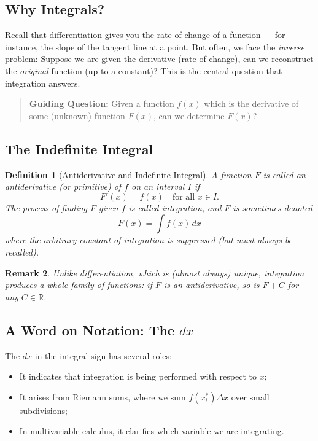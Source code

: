 \documentclass[11pt]{article}
\newtheorem{definition}{Definition}[section]
\newtheorem{remark}[definition]{Remark}
\theoremstyle{definition}
\begin{document}
\subsection*{Why Integrals?}

Recall that differentiation gives you the rate of change of a function — for instance, the slope of the tangent line at a point. But often, we face the \emph{inverse} problem: Suppose we are given the derivative (rate of change), can we reconstruct the \emph{original} function (up to a constant)? This is the central question that integration answers.

\bigskip

\begin{quote}
\textbf{Guiding Question:} Given a function $f(x)$ which is the derivative of some (unknown) function $F(x)$, can we determine $F(x)$?
\end{quote}

\subsection*{The Indefinite Integral}

\begin{definition}[Antiderivative and Indefinite Integral]
A function $F$ is called an \emph{antiderivative} (or \emph{primitive}) of $f$ on an interval $I$ if
\[
    F'(x) = f(x) \quad \text{for all } x \in I.
\]
The process of finding $F$ given $f$ is called \emph{integration}, and $F$ is sometimes denoted
\[
    F(x) = \int f(x)\, dx
\]
where the arbitrary constant of integration is suppressed (but must always be recalled).
\end{definition}

\begin{remark}
Unlike differentiation, which is (almost always) unique, integration produces a whole family of functions: if $F$ is an antiderivative, so is $F + C$ for any $C \in \mathbb{R}$.
\end{remark}

\subsection*{A Word on Notation: The $dx$}

The $dx$ in the integral sign has several roles:
\begin{itemize}
    \item It indicates that integration is being performed with respect to $x$;
    \item It arises from Riemann sums, where we sum $f(x_i^*)\Delta x$ over small subdivisions;
    \item In multivariable calculus, it clarifies which variable we are integrating.
\end{itemize}
\end{document}
